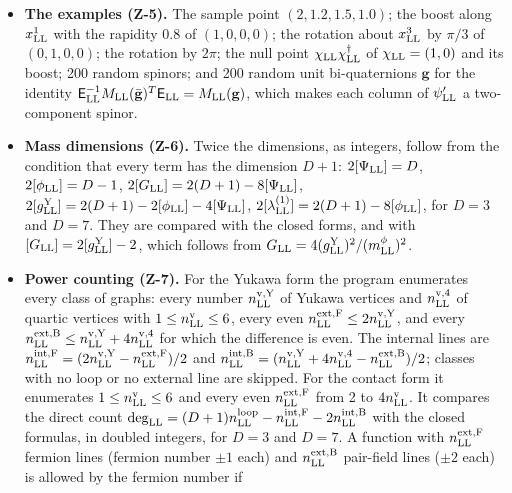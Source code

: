 \documentclass[
  10pt,
]{article}
\begin{document}
\begin{itemize}
  of \(\mathfrak{so}(3,1)\), and the rank 6 of the Gram matrix of the
  six matrices.
\item
  \textbf{The examples (Z-5).} The sample point \((2,1.2,1.5,1.0)\); the
  boost along \(x^1_{\rm LL}\) with the rapidity 0.8 of \((1,0,0,0)\);
  the rotation about \(x^3_{\rm LL}\) by \(\pi/3\) of \((0,1,0,0)\); the
  rotation by \(2\pi\); the null point
  \(\chi_{\rm LL}\chi_{\rm LL}^\dagger\) of \(\chi_{\rm LL}=(1,0)\) and
  its boost; 200 random spinors; and 200 random unit bi-quaternions
  \(\mathbf g\) for the identity
  \(\mathsf E_{\rm LL}^{-1}M_{\rm LL}(\bar{\mathbf g})^T\mathsf E_{\rm LL}=M_{\rm LL}(\mathbf g)\),
  which makes each column of \(\psi'_{\rm LL}\) a two-component spinor.
\item
  \textbf{Mass dimensions (Z-6).} Twice the dimensions, as integers,
  follow from the condition that every term has the dimension \(D+1\):
  \(2[\Psi_{\rm LL}]=D\), \(2[\phi_{\rm LL}]=D-1\),
  \(2[G_{\rm LL}]=2(D+1)-8[\Psi_{\rm LL}]\),
  \(2[g^{\rm Y}_{\rm LL}]=2(D+1)-2[\phi_{\rm LL}]-4[\Psi_{\rm LL}]\),
  \(2[\lambda^{(1)}_{\rm LL}]=2(D+1)-8[\phi_{\rm LL}]\), for \(D=3\) and
  \(D=7\). They are compared with the closed forms, and with
  \([G_{\rm LL}]=2[g^{\rm Y}_{\rm LL}]-2\), which follows from
  \(G_{\rm LL}=4(g^{\rm Y}_{\rm LL})^2/(m^\phi_{\rm LL})^2\).
\item
  \textbf{Power counting (Z-7).} For the Yukawa form the program
  enumerates every class of graphs: every number
  \(n^{\rm v,Y}_{\rm LL}\) of Yukawa vertices and
  \(n^{\rm v,4}_{\rm LL}\) of quartic vertices with
  \(1\le n^{\rm v}_{\rm LL}\le6\), every even
  \(n^{\rm ext,F}_{\rm LL}\le2n^{\rm v,Y}_{\rm LL}\), and every
  \(n^{\rm ext,B}_{\rm LL}\le n^{\rm v,Y}_{\rm LL}+4n^{\rm v,4}_{\rm LL}\)
  for which the difference is even. The internal lines are
  \(n^{\rm int,F}_{\rm LL}=(2n^{\rm v,Y}_{\rm LL}-n^{\rm ext,F}_{\rm LL})/2\)
  and
  \(n^{\rm int,B}_{\rm LL}=(n^{\rm v,Y}_{\rm LL}+4n^{\rm v,4}_{\rm LL}-n^{\rm ext,B}_{\rm LL})/2\);
  classes with no loop or no external line are skipped. For the contact
  form it enumerates \(1\le n^{\rm v}_{\rm LL}\le6\) and every even
  \(n^{\rm ext,F}_{\rm LL}\) from 2 to \(4n^{\rm v}_{\rm LL}\). It
  compares the direct count
  \(\deg_{\rm LL}=(D+1)n^{\rm loop}_{\rm LL}-n^{\rm int,F}_{\rm LL}-2n^{\rm int,B}_{\rm LL}\)
  with the closed formulas, in doubled integers, for \(D=3\) and
  \(D=7\). A function with \(n^{\rm ext,F}_{\rm LL}\) fermion lines
  (fermion number \(\pm1\) each) and \(n^{\rm ext,B}_{\rm LL}\)
  pair-field lines (\(\pm2\) each) is allowed by the fermion number if

\end{itemize}
\end{document}
